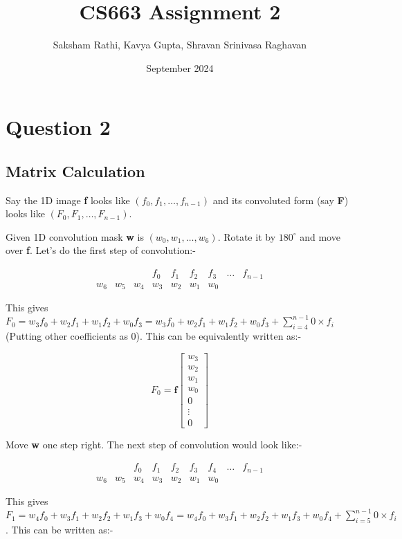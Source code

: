 \documentclass[12pt]{article}
\title{{\bf CS663 Assignment 2}}
\author{Saksham Rathi, Kavya Gupta, Shravan Srinivasa Raghavan}
\date{September 2024}
\begin{document}
\maketitle
\clearpage
\tableofcontents
\clearpage
\section*{Question 2}

\subsection*{Matrix Calculation}

Say the 1D image \textbf{f} looks like $(f_0, f_1, \ldots, f_{n-1})$ and its convoluted form (say \textbf{F}) looks like $(F_0, F_1, \ldots, F_{n-1})$.

Given 1D convolution mask \textbf{w} is $(w_0, w_1, \dots, w_6)$. Rotate it by $180^\circ$ and move over \textbf{f}. Let's do the first step of convolution:-

\[
    \begin{array}{cccccccccc}
        &      &      &    f_0 & f_1 & f_2 & f_3 & \dots & f_{n-1} \\
    w_6 & w_5 & w_4 & w_3 & w_2 & w_1 & w_0  
    \end{array}
\]

This gives $F_0 = w_3 f_0 + w_2 f_1 + w_1 f_2 + w_0 f_3 = w_3 f_0 + w_2 f_1 + w_1 f_2 + w_0 f_3 + \sum_{i=4}^{n-1} 0 \times f_i$ (Putting other coefficients as 0). This can be equivalently written as:-

\[
F_0 = \mathbf{f} \begin{bmatrix}
w_3 \\
w_2 \\
w_1 \\
w_0 \\
0 \\
\vdots \\
0
\end{bmatrix}
\]

Move \textbf{w} one step right. The next step of convolution would look like:-

\[
    \begin{array}{cccccccccc}
        &      &     f_0 & f_1 & f_2 & f_3 & f_4 & \dots & f_{n-1} \\
    w_6 & w_5 & w_4 & w_3 & w_2 & w_1 & w_0  
    \end{array}
\]

This gives $F_1 = w_4 f_0 + w_3 f_1 + w_2 f_2 + w_1 f_3 + w_0 f_4 = w_4 f_0 + w_3 f_1 + w_2 f_2 + w_1 f_3 + w_0 f_4 + \sum_{i=5}^{n-1}0 \times f_i$. This can be written as:-
\end{document}
